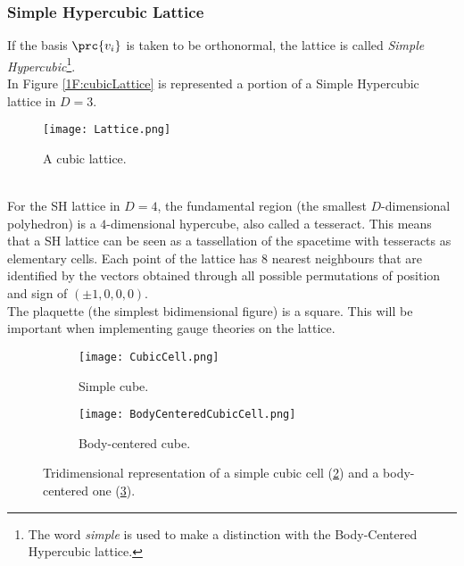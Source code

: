 \subsubsection{Simple Hypercubic Lattice}
If the basis $\prc{v_i}$ is taken to be orthonormal, the lattice is called \emph{Simple Hypercubic}\footnote{The word \emph{simple} is used to make a distinction with the Body-Centered Hypercubic lattice.}.\\
In Figure \eqref{1F:cubicLattice} is represented a portion of a Simple Hypercubic lattice in $D=3$.
\begin{figure}[!htbp]
    \centering
    \texttt{[image: Lattice.png]}
    \caption{A cubic lattice.}
    \label{1F:cubicLattice}
\end{figure}\\
For the SH lattice in $D=4$, the fundamental region (the smallest $D$-dimensional polyhedron) is a $4$-dimensional hypercube, also called a tesseract.
This means that a SH lattice can be seen as a tassellation of the spacetime with tesseracts as elementary cells.
Each point of the lattice has $8$ nearest neighbours that are identified by the vectors obtained through all possible permutations of position and sign of $(\pm1,0,0,0)$.\\
The plaquette (the simplest bidimensional figure) is a square.
This will be important when implementing gauge theories on the lattice.
\begin{figure}[!htbp]
    \centering
    \hspace{0.1\textwidth}
    \begin{subfigure}[b]{0.25\textwidth}
        \texttt{[image: CubicCell.png]}
        \caption{Simple cube.}
        \label{1F:CubicCell}
    \end{subfigure}
    \hspace{0.2\textwidth}
    \begin{subfigure}[b]{0.25\textwidth}
        \texttt{[image: BodyCenteredCubicCell.png]}
        \caption{Body-centered cube.}
        \label{1F:BCCubicCell}
    \end{subfigure}
    \hspace{0.2\textwidth}
    \caption{Tridimensional representation of a simple cubic cell (\ref{1F:CubicCell}) and a body-centered one (\ref{1F:BCCubicCell}).}
    \label{1F:ScBccCells}
\end{figure}

